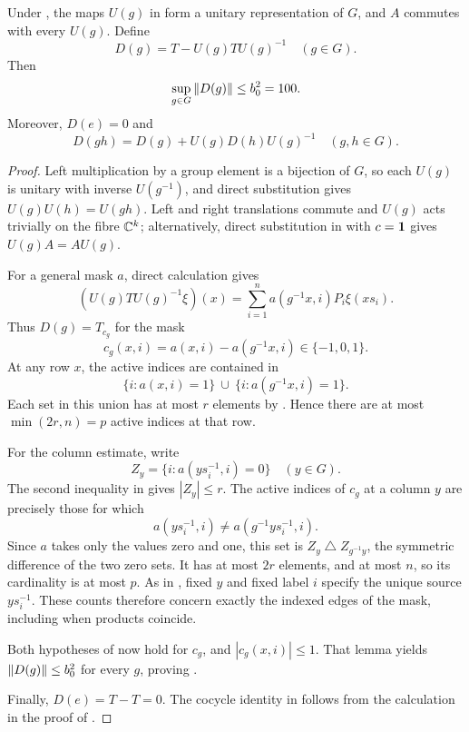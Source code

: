 \begin{proposition}
\label{prop:uniform-differences}
Under , the maps $U(g)$ in
 form a unitary representation of $G$,
and $A$ commutes with every $U(g)$.  Define
\[
 D(g)=T-U(g)TU(g)^{-1}\quad(g\in G).
\]
Then
\begin{equation}
\label{eq:uniform-difference-bound}
 \sup_{g\in G}\left\lVert D(g)\right\rVert\le b_0^2=100.
\end{equation}
Moreover, $D(e)=0$ and
\begin{equation}
\label{eq:weights-cocycle}
 D(gh)=D(g)+U(g)D(h)U(g)^{-1}\quad(g,h\in G).
\end{equation}
\end{proposition}

\begin{proof}
Left multiplication by a group element is a bijection of $G$, so
each $U(g)$ is unitary with inverse $U(g^{-1})$, and direct
substitution gives $U(g)U(h)=U(gh)$.
Left and right translations
commute and $U(g)$ acts trivially on the fibre $\mathbb C^k$; alternatively,
direct substitution in  with $c=\mathbf 1$
gives $U(g)A=AU(g)$.

For a general mask $a$, direct calculation gives
\[
 (U(g)TU(g)^{-1}\xi)(x)
 =\sum_{i=1}^n a(g^{-1}x,i)P_i\xi(xs_i).
\]
Thus $D(g)=T_{c_g}$ for the mask
\[
 c_g(x,i)=a(x,i)-a(g^{-1}x,i)\in\{-1,0,1\}.
\]
At any row $x$, the active indices are contained in
\[
 \{i:a(x,i)=1\}\ \cup\ \{i:a(g^{-1}x,i)=1\}.
\]
Each set in this union has at most $r$ elements by
.  Hence there are at most
$\min(2r,n)=p$ active indices at that row.

For the column estimate, write
\[
 Z_y=\{i:a(ys_i^{-1},i)=0\}\quad(y\in G).
\]
The second inequality in 
gives $|Z_y|\le r$.  The active indices of $c_g$ at a column $y$
are precisely those for which
\[
 a(ys_i^{-1},i)\ne a(g^{-1}ys_i^{-1},i).
\]
Since $a$ takes only the values zero and one, this set is
$Z_y\mathbin\triangle Z_{g^{-1}y}$, the symmetric difference of
the two zero sets.  It has at most $2r$ elements, and at most $n$,
so its cardinality is at most $p$.  As in ,
fixed $y$ and fixed label $i$ specify the unique source
$ys_i^{-1}$.  These counts therefore concern exactly the indexed
edges of the mask, including when products coincide.

Both hypotheses of  now hold for $c_g$, and
$|c_g(x,i)|\le1$.  That lemma yields
$\left\lVert D(g)\right\rVert\le b_0^2$ for every $g$, proving
.

Finally, $D(e)=T-T=0$. The cocycle identity in
 follows from the calculation in the proof
of .
\end{proof}
